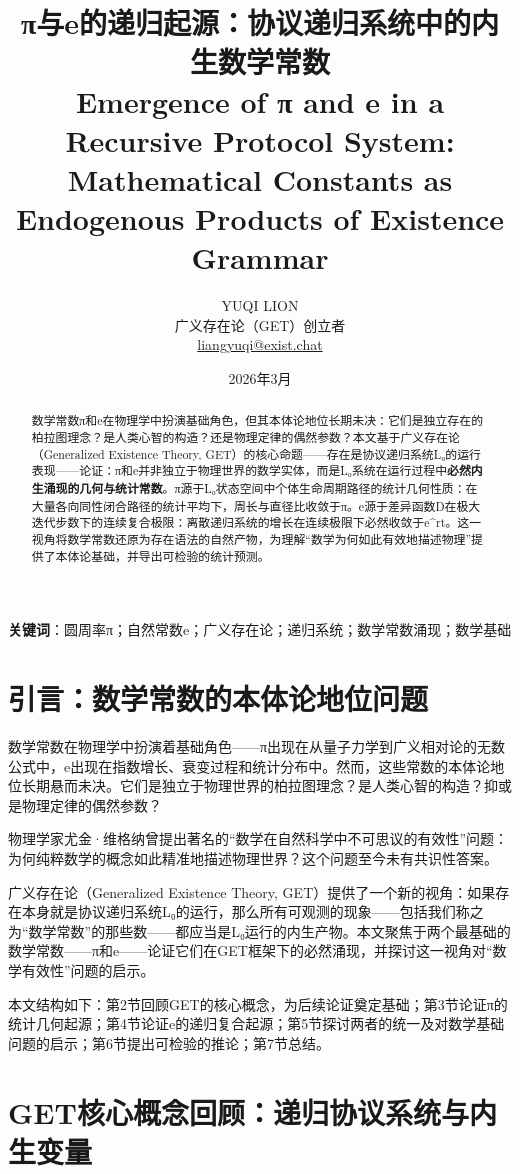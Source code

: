 \documentclass[12pt, a4paper]{article}
\title{\textbf{π与e的递归起源：协议递归系统中的内生数学常数}\\
\large Emergence of π and e in a Recursive Protocol System: \\
Mathematical Constants as Endogenous Products of Existence Grammar}
\author{YUQI LION \\[4pt]
\small 广义存在论（GET）创立者 \\[2pt]
\small \href{mailto:liangyuqi@exist.chat}{liangyuqi@exist.chat}}
\date{\small 2026年3月}
\begin{document}
\maketitle

\begin{abstract}
数学常数π和e在物理学中扮演基础角色，但其本体论地位长期未决：它们是独立存在的柏拉图理念？是人类心智的构造？还是物理定律的偶然参数？本文基于广义存在论（Generalized Existence Theory, GET）的核心命题——存在是协议递归系统L₀的运行表现——论证：π和e并非独立于物理世界的数学实体，而是L₀系统在运行过程中\textbf{必然内生涌现的几何与统计常数}。π源于L₀状态空间中个体生命周期路径的统计几何性质：在大量各向同性闭合路径的统计平均下，周长与直径比收敛于π。e源于差异函数D在极大迭代步数下的连续复合极限：离散递归系统的增长在连续极限下必然收敛于e^{rt}。这一视角将数学常数还原为存在语法的自然产物，为理解“数学为何如此有效地描述物理”提供了本体论基础，并导出可检验的统计预测。
\end{abstract}

\noindent \textbf{关键词}：圆周率π；自然常数e；广义存在论；递归系统；数学常数涌现；数学基础

\newpage

\section{引言：数学常数的本体论地位问题}

数学常数在物理学中扮演着基础角色——π出现在从量子力学到广义相对论的无数公式中，e出现在指数增长、衰变过程和统计分布中。然而，这些常数的本体论地位长期悬而未决\cite{shapiro2000}。它们是独立于物理世界的柏拉图理念？是人类心智的构造？抑或是物理定律的偶然参数？

物理学家尤金·维格纳曾提出著名的“数学在自然科学中不可思议的有效性”问题\cite{wigner1960}：为何纯粹数学的概念如此精准地描述物理世界？这个问题至今未有共识性答案。

广义存在论（Generalized Existence Theory, GET）\cite{liang2025}提供了一个新的视角：如果存在本身就是协议递归系统L₀的运行，那么所有可观测的现象——包括我们称之为“数学常数”的那些数——都应当是L₀运行的内生产物。本文聚焦于两个最基础的数学常数——π和e——论证它们在GET框架下的必然涌现，并探讨这一视角对“数学有效性”问题的启示。

本文结构如下：第2节回顾GET的核心概念，为后续论证奠定基础；第3节论证π的统计几何起源；第4节论证e的递归复合起源；第5节探讨两者的统一及对数学基础问题的启示；第6节提出可检验的推论；第7节总结。

\section{GET核心概念回顾：递归协议系统与内生变量}
\end{document}

